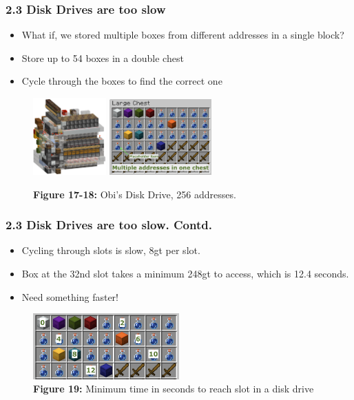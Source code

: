 \documentclass[aspectratio=169]{beamer}
\begin{document}
\begin{frame}
	\frametitle{2.3 Disk Drives are too slow}

    \begin{itemize}
		\item What if, we stored multiple boxes from different addresses in a single block?
		\item Store up to 54 boxes in a double chest
		\item Cycle through the boxes to find the correct one
	\end{itemize}
    \begin{figure}
        \includegraphics[width=0.25\textwidth]{diskdrive.png}
        \includegraphics[width=0.35\textwidth]{diskcontent.png}
        \caption{\textbf{Figure 17-18:} Obi's Disk Drive, 256 addresses.}
    \end{figure}
\end{frame}



\begin{frame}
	\frametitle{2.3 Disk Drives are too slow. Contd.}

    \begin{itemize}
		\item Cycling through slots is slow, 8gt per slot.
		\item Box at the 32nd slot takes a minimum 248gt to access, which is 12.4 seconds.
		\item Need something faster!
	\end{itemize}
    \begin{figure}
        \includegraphics[width=0.5\textwidth]{diskcontent2.png}
        \caption{\textbf{Figure 19:} Minimum time in seconds to reach slot in a disk drive}
    \end{figure}
\end{frame}
\end{document}
